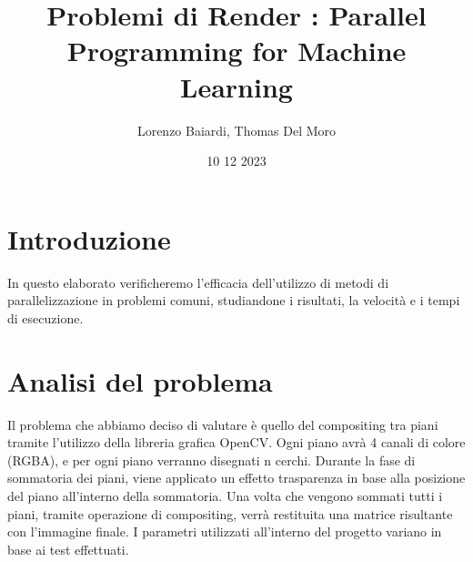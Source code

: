 \documentclass[11pt]{article}
\title{Problemi di Render : Parallel Programming for Machine Learning}
\author{Lorenzo Baiardi, Thomas Del Moro}
\date{10 12 2023}
\begin{document}
    \maketitle
    \clearpage


    \section{Introduzione}\label{sec:introduzione}
    In questo elaborato verificheremo l'efficacia dell'utilizzo di metodi di parallelizzazione in problemi comuni,
    studiandone i risultati, la velocità e i tempi di esecuzione.

    \section{Analisi del problema}\label{sec:analisi-del-problema}
    Il problema che abbiamo deciso di valutare è quello del compositing tra piani tramite l'utilizzo della libreria
    grafica OpenCV\@.
    Ogni piano avrà 4 canali di colore (RGBA), e per ogni piano verranno disegnati n cerchi.
    Durante la fase di sommatoria dei piani, viene applicato un effetto trasparenza in base alla posizione del piano
    all'interno della sommatoria.
    Una volta che vengono sommati tutti i piani, tramite operazione di compositing, verrà restituita una matrice
    risultante con l'immagine finale.
    I parametri utilizzati all'interno del progetto variano in base ai test effettuati.
\end{document}
